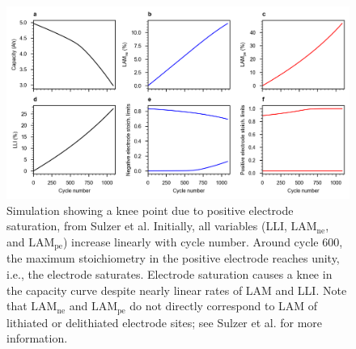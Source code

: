 \documentclass[journal=jpclcd,manuscript=article]{achemso}
\begin{document}
\begin{figure}
    \centering
    \includegraphics[width=\linewidth]{figures/stoich_knee.png}
    \caption{Simulation showing a knee point due to positive electrode saturation, from Sulzer et al.\cite{sulzer_accelerated_2021} Initially, all variables (LLI, $\mathrm{LAM_{ne}}$, and $\mathrm{LAM_{pe}}$) increase linearly with cycle number. Around cycle 600, the maximum stoichiometry in the positive electrode reaches unity, i.e., the electrode saturates. Electrode saturation causes a knee in the capacity curve despite nearly linear rates of LAM and LLI.
    Note that $\mathrm{LAM_{ne}}$ and $\mathrm{LAM_{pe}}$ do not directly correspond to LAM of lithiated or delithiated electrode sites; see Sulzer et al.\cite{sulzer_accelerated_2021} for more information.}
    \label{fig:electrode_sat_simulation}
\end{figure}

\end{document}
